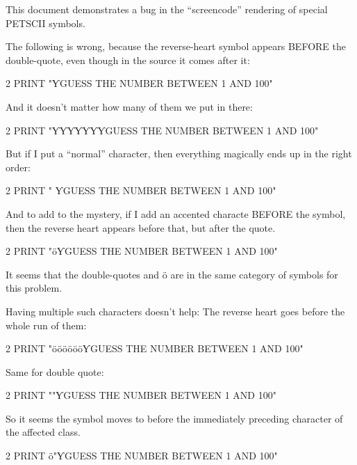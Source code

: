 

This document demonstrates a bug in the ``screencode'' rendering of special PETSCII symbols.

The following is wrong, because the reverse-heart symbol appears BEFORE
the double-quote, even though in the source it comes after it:
\begin{screencode}
2 PRINT "ƳGUESS THE NUMBER BETWEEN 1 AND 100"
\end{screencode}

And it doesn't matter how many of them we put in there:
\begin{screencode}
2 PRINT "ƳƳƳƳƳƳƳGUESS THE NUMBER BETWEEN 1 AND 100"
\end{screencode}

But if I put a ``normal'' character, then everything magically ends up in the right order:

\begin{screencode}
2 PRINT " ƳGUESS THE NUMBER BETWEEN 1 AND 100"
\end{screencode}

And to add to the mystery, if I add an accented characte BEFORE the symbol, then the reverse
heart appears before that, but after the quote.

\begin{screencode}
2 PRINT "öƳGUESS THE NUMBER BETWEEN 1 AND 100"
\end{screencode}

It seems that the double-quotes and ö are in the same category of symbols for this problem.

Having multiple such characters doesn't help: The reverse heart goes before the whole run
of them:

\begin{screencode}
2 PRINT "ööööööƳGUESS THE NUMBER BETWEEN 1 AND 100"
\end{screencode}

Same for double quote:

\begin{screencode}
2 PRINT ""ƳGUESS THE NUMBER BETWEEN 1 AND 100"
\end{screencode}

So it seems the symbol moves to before the immediately preceding character of the affected class.

\begin{screencode}
2 PRINT ö"ƳGUESS THE NUMBER BETWEEN 1 AND 100"
\end{screencode}



